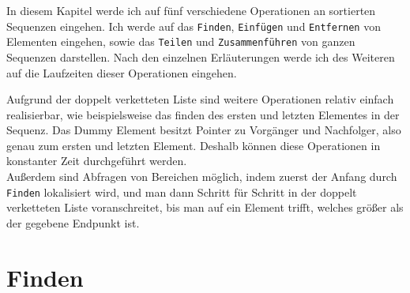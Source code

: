 In diesem Kapitel werde ich auf fünf verschiedene Operationen an sortierten Sequenzen eingehen. Ich werde auf das \texttt{Finden}, \texttt{Einfügen} und \texttt{Entfernen} von Elementen eingehen, sowie das \texttt{Teilen} und \texttt{Zusammenführen} von ganzen Sequenzen darstellen. Nach den einzelnen Erläuterungen werde ich des Weiteren auf die Laufzeiten dieser Operationen eingehen.
\par
Aufgrund der doppelt verketteten Liste sind weitere Operationen relativ einfach realisierbar, wie beispielsweise das finden des ersten und letzten Elementes in der Sequenz. Das Dummy Element besitzt Pointer zu Vorgänger und Nachfolger, also genau zum ersten und letzten Element. Deshalb können diese Operationen in konstanter Zeit durchgeführt werden.
\\
Außerdem sind Abfragen von Bereichen möglich, indem zuerst der Anfang durch \texttt{Finden} lokalisiert wird, und man dann Schritt für Schritt in der doppelt verketteten Liste voranschreitet, bis man auf ein Element trifft, welches größer als der gegebene Endpunkt ist.
\\
\cite{Sanders:19}

\section{Finden}
\label{section:locate}

